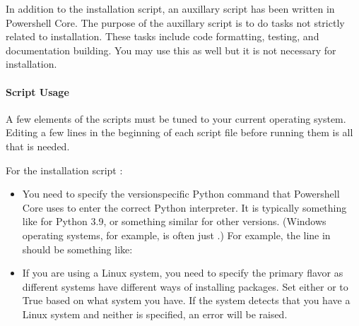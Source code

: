 \documentclass[letterpaper,11pt,english]{sphinxmanual}
\begin{document}
\sphinxAtStartPar
In addition to the installation script, an auxillary script has been written in
Powershell Core. The purpose of the auxillary script is to do tasks not
strictly related to installation. These tasks include code formatting,
testing, and documentation building. You may use this as well but it is not
necessary for installation.


\paragraph{Script Usage}
\label{\detokenize{technical/installation/index:script-usage}}
\sphinxAtStartPar
A few elements of the scripts must be tuned to your current operating system.
Editing a few lines in the beginning of each script file before running them
is all that is needed.

\sphinxAtStartPar
For the installation script :
\begin{itemize}
\item {} 
\sphinxAtStartPar
You need to specify the version\sphinxhyphen{}specific Python command that Powershell Core uses to enter the correct Python interpreter. It is typically something like  for Python 3.9, or something similar for other versions. (Windows operating systems, for example, is often just .) For example, the line in  should be something like:

\begin{sphinxVerbatim}[commandchars=\\\{\}]
    
\end{sphinxVerbatim}

\item {} 
\sphinxAtStartPar
If you are using a Linux system, you need to specify the primary flavor as different systems have different ways of installing packages. Set either  or  to True based on what system you have. If the system detects that you have a Linux system and neither is specified, an error will be raised.

\end{itemize}
\end{document}
